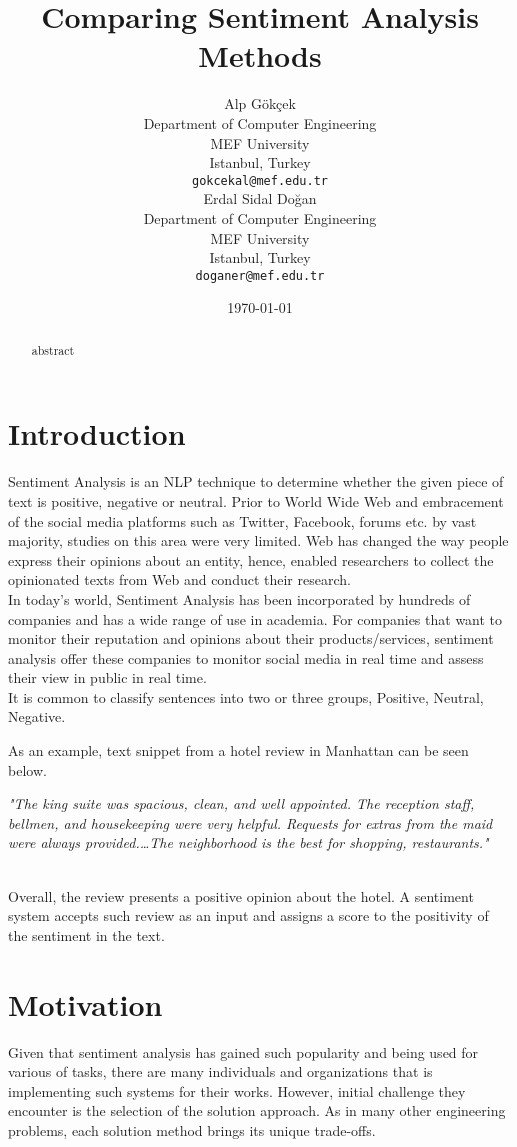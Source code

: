 \documentclass[11pt,a4paper]{article}
\title{Comparing Sentiment Analysis Methods}
\author{Alp Gökçek \\
  Department of Computer Engineering\\
  MEF University\\
  Istanbul, Turkey \\
  \texttt{gokcekal@mef.edu.tr} \\\And
  Erdal Sidal Doğan \\
  Department of Computer Engineering\\
  MEF University\\
  Istanbul, Turkey \\
  \texttt{doganer@mef.edu.tr} \\}
\date{\today}
\begin{document}
\maketitle
\begin{abstract}
abstract
\end{abstract}

\section{Introduction}
Sentiment Analysis is an NLP technique to determine whether the given piece of text is positive, negative or neutral. Prior to World Wide Web and embracement of the social media platforms such as Twitter, Facebook, forums etc. by vast majority, studies on this area were very limited. Web has changed the way people express their opinions about an entity, hence, enabled researchers to collect the opinionated texts from Web and conduct their research.\\

In today's world, Sentiment Analysis has been incorporated by hundreds of companies and has a wide range of use in academia. For companies that want to monitor their reputation and opinions about their products/services, sentiment analysis offer these companies to monitor social media in real time and assess their view in public in real time.\\

It is common to classify sentences into two or three groups, Positive, Neutral, Negative.

As an example, text snippet from a hotel review in Manhattan can be seen below.\\

\parbox{0.45\textwidth}{
	\centering
	\small
	\textit{
		"The king suite was spacious, clean, and well appointed. The reception staff, bellmen, and housekeeping were very helpful. Requests for extras from the maid were always provided.\ldots The neighborhood is the best for shopping, restaurants." \cite{ronen}
	}
}\\

Overall, the review presents a positive opinion about the hotel. A sentiment system accepts such review as an input and assigns a score to the positivity of the sentiment in the text.

\section{Motivation}
Given that sentiment analysis has gained such popularity and being used for various of tasks, there are many individuals and organizations that is implementing such systems for their works. However, initial challenge they encounter is the selection of the solution approach. As in many other engineering problems, each solution method brings its unique trade-offs. \\
\end{document}
